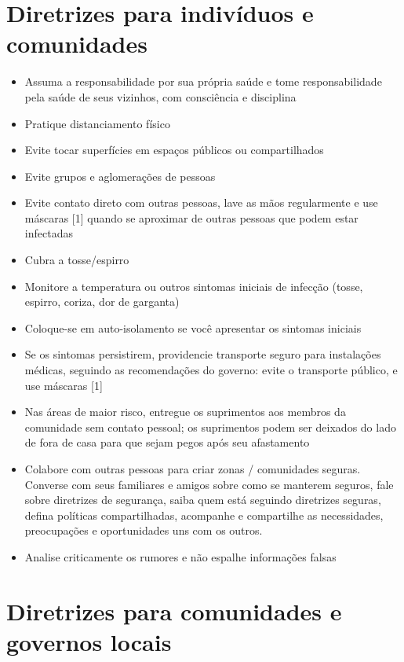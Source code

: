 \documentclass[onecolumn,journal]{IEEEtran}
\begin{document}
\begin{multicols}{2}
\section*{Diretrizes para indivíduos e comunidades}
\begin{itemize}
\item Assuma a responsabilidade por sua própria saúde e tome responsabilidade pela saúde de seus vizinhos, com consciência e disciplina
\item Pratique distanciamento físico
\item Evite tocar superfícies em espaços públicos ou compartilhados
\item Evite grupos e aglomerações de pessoas
\item Evite contato direto com outras pessoas, lave as mãos regularmente e use máscaras [1] quando se aproximar de outras pessoas que podem estar infectadas
\item Cubra a tosse/espirro
\item Monitore a temperatura ou outros sintomas iniciais de infecção (tosse, espirro, coriza, dor de garganta)
\item Coloque-se em auto-isolamento se você apresentar os sintomas iniciais
\item Se os sintomas persistirem, providencie transporte seguro para instalações médicas, seguindo as recomendações do governo: evite o transporte público, e use máscaras [1]
\item Nas áreas de maior risco, entregue os suprimentos aos membros da comunidade sem contato pessoal; os suprimentos podem ser deixados do lado de fora de casa para que sejam pegos após seu afastamento
\item Colabore com outras pessoas para criar zonas / comunidades seguras. Converse com seus familiares e amigos sobre como se manterem seguros, fale sobre diretrizes de segurança, saiba quem está seguindo diretrizes seguras, defina políticas compartilhadas, acompanhe e compartilhe as necessidades, preocupações e oportunidades uns com os outros.
\item Analise criticamente os rumores e não espalhe informações falsas

\end{itemize}

\vspace{2ex}

\section*{Diretrizes para comunidades e governos locais}
\begin{itemize}


\end{itemize}
\end{multicols}
\end{document}
